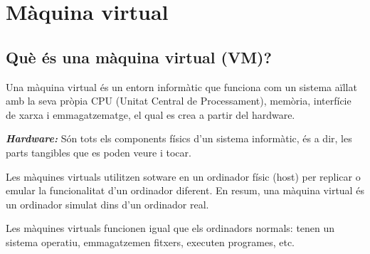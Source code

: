 \section{Màquina virtual} \label{sec:mv}
\subsection{Què és una màquina virtual (VM)?}
Una màquina virtual és un entorn informàtic que funciona com un sistema aïllat amb la seva pròpia CPU (Unitat Central de Processament), memòria, interfície de xarxa i emmagatzematge, el qual es crea a partir del hardware.

\textit{\textbf{Hardware:}} Són tots els components físics d’un sistema informàtic, és a dir, les parts tangibles que es poden veure i tocar.

Les màquines virtuals utilitzen sotware en un ordinador físic (host) per replicar o emular la funcionalitat d’un ordinador diferent. En resum, una màquina virtual és un ordinador simulat dins d’un ordinador real.

Les màquines virtuals funcionen igual que els ordinadors normals: tenen un sistema operatiu, emmagatzemen fitxers, executen programes, etc.

